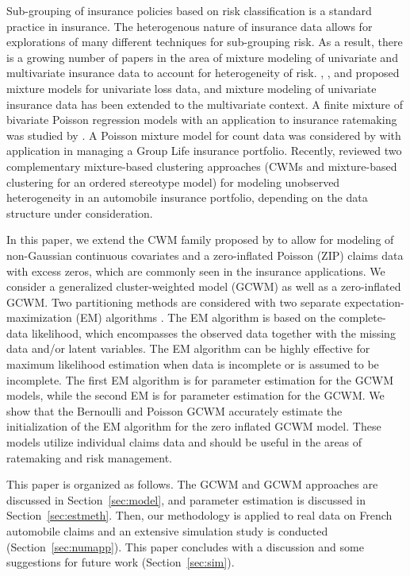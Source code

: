 \documentclass[12pt,letterpaper]{article}
\numberwithin{equation}{section}
\numberwithin{equation}{section}
\numberwithin{equation}{section}
\begin{document}
Sub-grouping of insurance policies based on risk classification is a standard practice in insurance. The heterogenous nature of insurance data allows for explorations of many different techniques for sub-grouping risk. As a result, there is a growing number of papers in the area of mixture modeling of univariate and multivariate insurance data to account for heterogeneity of risk. \cite{Lee+Lin:2010}, \cite{Verbelen+Gong+Antonio+Badescu+Lin:2015}, and \cite{Miljkovic+Grun:2016} proposed mixture models for univariate loss data, and mixture modeling of univariate insurance data has been extended to the multivariate context. A finite mixture of bivariate Poisson regression models with an application to insurance ratemaking was studied by \cite{Bermudez+Karlis:2012}. A Poisson mixture model for count data was considered by \cite{Brown+Buckley:2015} with application in managing a Group Life insurance portfolio. Recently, \cite{risks_miljkovic} reviewed two complementary mixture-based clustering approaches (CWMs and mixture-based clustering for an ordered stereotype model) for modeling unobserved heterogeneity in an automobile insurance portfolio, depending on the data structure under consideration. 

In this paper, we extend the CWM family proposed by \cite{Ingrassia+Punzo+Vittadini+Minotti:2015} to allow for modeling of non-Gaussian continuous covariates and a zero-inflated Poisson (ZIP) claims data with excess zeros, which are commonly seen in the insurance applications. We consider a generalized cluster-weighted model (GCWM) as well as a zero-inflated GCWM. Two partitioning methods are considered with two separate expectation-maximization (EM) algorithms \citep{Dempster+Laird+Rubin:1977}. The EM algorithm is based on the complete-data likelihood, which encompasses the observed data together with the missing data and/or latent variables. The EM algorithm can be highly effective for maximum likelihood estimation when data is incomplete or is assumed to be incomplete. The first EM algorithm is for parameter estimation for the GCWM models, while the second EM is for parameter estimation for the GCWM. We show that the Bernoulli and Poisson GCWM accurately estimate the initialization of the EM algorithm for the zero inflated GCWM model. These models utilize individual claims data and should be useful in the areas of ratemaking and risk management.

This paper is organized as follows. The GCWM and GCWM approaches are discussed in Section~\ref{sec:model}, and parameter estimation is discussed in Section~\ref{sec:estmeth}. Then, our methodology is applied to real data on French automobile claims and an extensive simulation study is conducted (Section~\ref{sec:numapp}). This paper concludes with a discussion and some suggestions for future work (Section~\ref{sec:sim}).
\end{document}
